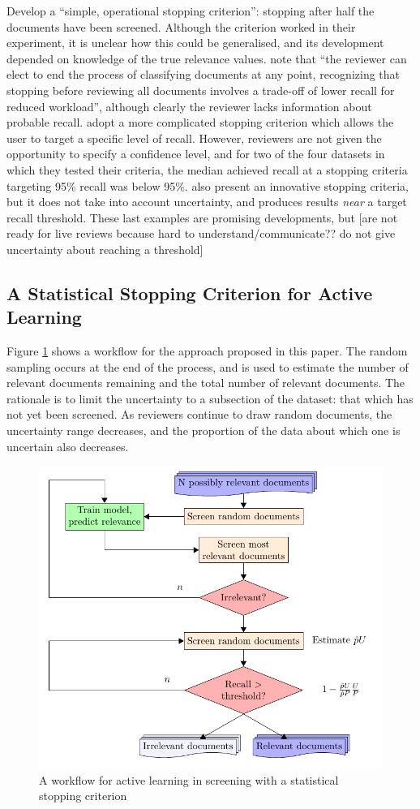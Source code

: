 \documentclass{bmcart}
\begin{document}
\cite{Wallace2010a} Develop a ``simple, operational stopping criterion'': stopping after half the documents have been screened. Although the criterion worked in their experiment, it is unclear how this could be generalised, and its development depended on knowledge of the true relevance values. 
\cite{Jonnalagadda2013} note that ``the reviewer can elect to end the process of classifying documents at any point, recognizing that stopping before reviewing all documents involves a trade-off of lower recall for reduced workload'', although clearly the reviewer lacks information about probable recall.
\cite{Yu2019} adopt a more complicated stopping criterion  which allows the user to target a specific level of recall. However, reviewers are not given the opportunity to specify a confidence level, and for two of the four datasets in which they tested their criteria, the median achieved recall at a stopping criteria targeting 95\% recall was below 95\%. \cite{DiNunzio2018} also present an innovative stopping criteria, but it does not take into account uncertainty, and produces results \textit{near} a target recall threshold. 
These last examples are promising developments, but [are not ready for live reviews because hard to understand/communicate?? do not give uncertainty about reaching a threshold]



\subsection*{A Statistical Stopping Criterion for Active Learning}
	Figure \ref{flow} shows a workflow for the approach proposed in this paper. 
	The random sampling occurs at the end of the process, and is used to estimate the number of relevant documents remaining and the total number of relevant documents. 
	The rationale is to limit the uncertainty to a subsection of the dataset: that which has not yet been screened. 
	As reviewers continue to draw random documents, the uncertainty range decreases, and the proportion of the data about which one is uncertain also decreases.
	
	\begin{figure}
		\includegraphics[width=0.5\linewidth]{../images/flow}
		\caption{A workflow for active learning in screening with a statistical stopping criterion}
		\label{flow}
	\end{figure}
	
\end{document}
